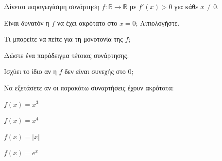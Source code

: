 \documentclass[11pt,a4paper,modern]{FFExercises}
\begin{document}
\askhsh
Δίνεται παραγωγίσιμη συνάρτηση $f: \mathbb{R} \to \mathbb{R}$ με $f'(x) > 0$ για κάθε $x \neq 0$.
\begin{alist}
    \item Είναι δυνατόν η $f$ να έχει ακρότατο στο $x = 0$; Αιτιολογήστε.
    \item Τι μπορείτε να πείτε για τη μονοτονία της $f$;
    \item Δώστε ένα παράδειγμα τέτοιας συνάρτησης.
    \item Ισχύει το ίδιο αν η $f$ δεν είναι συνεχής στο $0$;
\end{alist}

\askhsh
Να εξετάσετε αν οι παρακάτω συναρτήσεις έχουν ακρότατα:
\begin{alist}
    \item $f(x) = x^3$
    \item $f(x) = x^4$
    \item $f(x) = |x|$
    \item $f(x) = e^x$
\end{alist}
\end{document}
